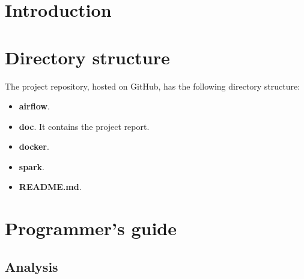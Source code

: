 
\section{Introduction}

\section{Directory structure}
\nonzeroparskip The project repository, hosted on GitHub, has the following directory structure:
\begin{itemize}
	\item \textbf{airflow}.
	\item \textbf{doc}. It contains the project report.
	\item \textbf{docker}. 
	\item \textbf{spark}. 
	\item \textbf{README.md}. 
\end{itemize}

\section{Programmer's guide}

\subsection{Analysis}


